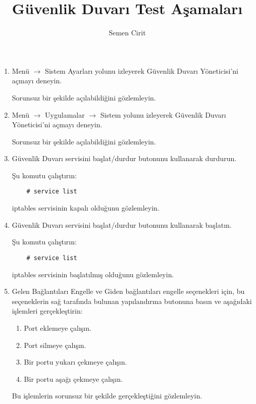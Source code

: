 \documentclass[a4paper,10pt]{article}
\title{Güvenlik Duvarı Test Aşamaları}
\author{Semen Cirit}
\begin{document}
\maketitle

\begin{enumerate}
    \item Menü $\rightarrow$ Sistem Ayarları yolunu izleyerek Güvenlik Duvarı Yöneticisi'ni açmayı deneyin.

    Sorunsuz bir şekilde açılabildiğini gözlemleyin.
    \item Menü $\rightarrow$ Uygulamalar $\rightarrow$ Sistem yolunu izleyerek Güvenlik Duvarı Yöneticisi'ni açmayı deneyin.

	Sorunsuz bir şekilde açılabildiğini gözlemleyin.
    \item Güvenlik Duvarı servisini başlat/durdur butonunu kullanarak durdurun.

    Şu komutu çalıştırın:

	\begin{verbatim}
	# service list
	\end{verbatim} 

    iptables servisinin kapalı olduğunu gözlemleyin.

    \item Güvenlik Duvarı servisini başlat/durdur butonunu kullanarak başlatın.

        Şu komutu çalıştırın:
	
	\begin{verbatim}
	# service list
	\end{verbatim}

       iptables servisinin başlatılmış olduğunu gözlemleyin.

\item Gelen Bağlantıları Engelle ve Giden bağlantıları engelle seçenekleri için, bu seçeneklerin sağ tarafında bulunan yapılandırma butonuna basın ve aşağıdaki işlemleri gerçekleştirin:

    \begin{enumerate}
        \item Port eklemeye çalışın.
        \item Port silmeye çalışın.
        \item Bir portu yukarı çekmeye çalışın.
        \item Bir portu aşağı çekmeye çalışın.
    \end{enumerate}

Bu işlemlerin sorunsuz bir şekilde gerçekleştiğini gözlemleyin.


\end{enumerate}
\end{document}
